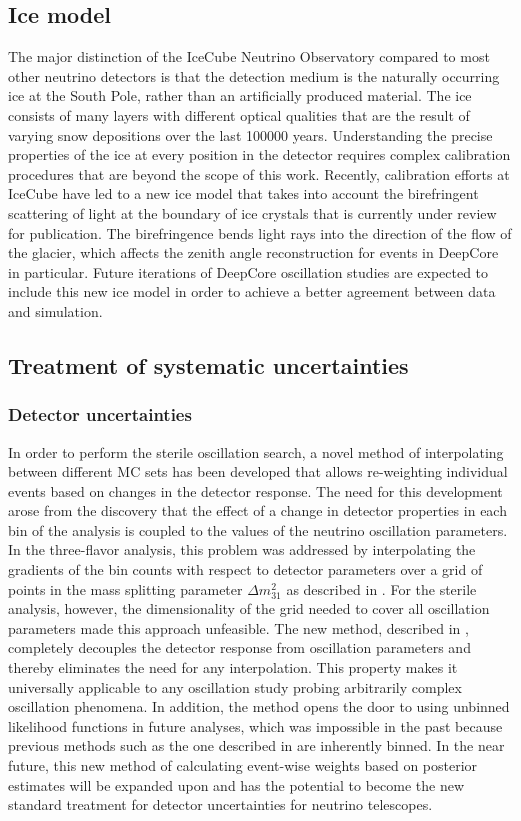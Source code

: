 \subsection{Ice model}
The major distinction of the IceCube Neutrino Observatory compared to most other neutrino detectors is that the detection medium is the naturally occurring ice at the South Pole, rather than an artificially produced material. The ice consists of many layers with different optical qualities that are the result of varying snow depositions over the last \num{100000} years. Understanding the precise properties of the ice at every position in the detector requires complex calibration procedures that are beyond the scope of this work. Recently, calibration efforts at IceCube have led to a new ice model that takes into account the birefringent scattering of light at the boundary of ice crystals that is currently under review for publication. The birefringence bends light rays into the direction of the flow of the glacier, which affects the zenith angle reconstruction for events in DeepCore in particular. Future iterations of DeepCore oscillation studies are expected to include this new ice model in order to achieve a better agreement between data and simulation.

\subsection{Treatment of systematic uncertainties}
\subsubsection{Detector uncertainties}
In order to perform the sterile oscillation search, a novel method of interpolating between different MC sets has been developed that allows re-weighting individual events based on changes in the detector response. The need for this development arose from the discovery that the effect of a change in detector properties in each bin of the analysis is coupled to the values of the neutrino oscillation parameters. In the three-flavor analysis, this problem was addressed by interpolating the gradients of the bin counts with respect to detector parameters over a grid of points in the mass splitting parameter $\Delta m^2_{31}$ as described in . For the sterile analysis, however, the dimensionality of the grid needed to cover all oscillation parameters made this approach unfeasible. The new method, described in , completely decouples the detector response from oscillation parameters and thereby eliminates the need for any interpolation. This property makes it universally applicable to any oscillation study probing arbitrarily complex oscillation phenomena. In addition, the method opens the door to using unbinned likelihood functions in future analyses, which was impossible in the past because previous methods such as the one described in  are inherently binned. In the near future, this new method of calculating event-wise weights based on posterior estimates will be expanded upon and has the potential to become the new standard treatment for detector uncertainties for neutrino telescopes.

